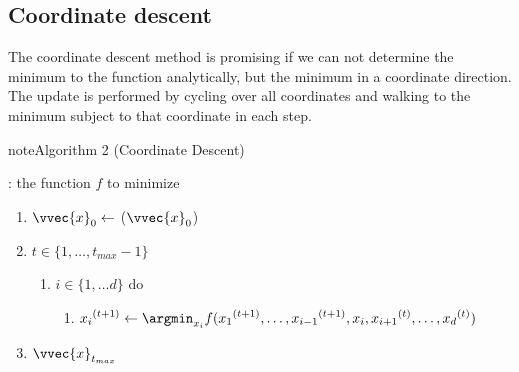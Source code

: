 \documentclass[letterpaper,10pt,english]{jupyterBook}
\begin{document}
\subsection{Coordinate descent}
\label{\detokenize{optimization_numerical:coordinate-descent}}
\sphinxAtStartPar
The coordinate descent method is promising if we can not determine the minimum to the function analytically, but the minimum in a coordinate direction. The update is performed by cycling over all coordinates and walking to the minimum subject to that coordinate in each step.
\label{optimization_numerical:algorithm-1}
\begin{sphinxadmonition}{note}{Algorithm 2 (Coordinate Descent)}



\sphinxAtStartPar
{}: the function \(f\) to minimize
\begin{enumerate}
%
\item {} 
\sphinxAtStartPar
\(\vvec{x}_0\gets\) (\(\vvec{x}_0\))

\item {} 
\sphinxAtStartPar
{} \(t\in\{1,\ldots,t_{max}-1\}\)
\begin{enumerate}
%
\item {} 
\sphinxAtStartPar
{} \(i\in\{1,\ldots d\}\) do
\begin{enumerate}
%
\item {} 
\sphinxAtStartPar
\(\displaystyle {x_i}^{(t+1)}\leftarrow \argmin_{x_i} f({x_1}^{(t+1)},\ldots ,{x_{i-1}}^{(t+1)}, x_i,{x_{i+1}}^{(t)},\ldots ,{x_d}^{(t)})\)

\end{enumerate}

\end{enumerate}

\item {} 
\sphinxAtStartPar
{} \(\vvec{x}_{t_{max}}\)

\end{enumerate}
\end{sphinxadmonition}
\end{document}
